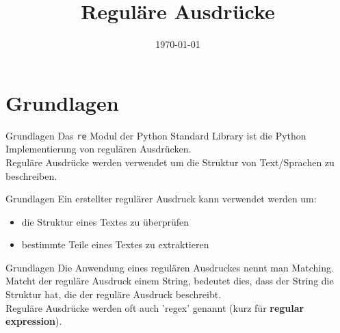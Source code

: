 


\newcommand{\topic}{
	Regul\"are Ausdr\"ucke
}

\title{\topic}
\supertitle{\course}
\date{\today}



\maketitle

\begin{frame}
	\tableofcontents
\end{frame}

\section{Grundlagen}
\begin{frame}{Grundlagen}
	Das \texttt{re} Modul der Python Standard Library ist die Python Implementierung von regulären Ausdrücken.\\[.25cm]
	Reguläre Ausdrücke werden verwendet um die Struktur von Text/Sprachen zu beschreiben.
\end{frame}

\begin{frame}{Grundlagen}
	Ein erstellter regul\"arer Ausdruck kann verwendet werden um:
	\begin{itemize}
		\item die Struktur eines Textes zu \"uberpr\"ufen
		\item bestimmte Teile eines Textes zu extraktieren
	\end{itemize}
\end{frame}

\begin{frame}{Grundlagen}
	Die Anwendung eines regulären Ausdruckes nennt man Matching.\\[.25cm]
Matcht der reguläre Ausdruck einem String, bedeutet dies, dass der String die Struktur hat, die der reguläre Ausdruck beschreibt.\\[.25cm]
Reguläre Ausdrücke werden oft auch 'regex' genannt (kurz für \textbf{regular expression}).
\end{frame}

